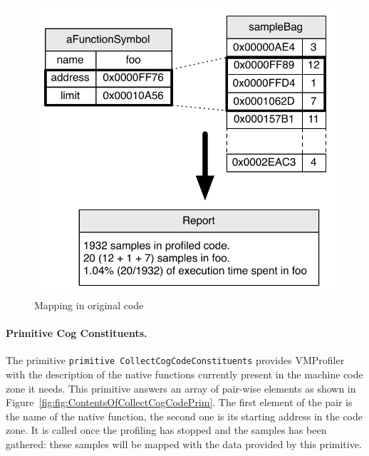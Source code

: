 \documentclass[10pt,preprint,nonatbib]{sigplanconf}
\newcommand{\ct}{\lstinline[backgroundcolor=\color{white},basicstyle=\small\ttfamily]}
\newcommand{\figlabel}[1]{\label{fig:#1}}
\newcommand{\figref}[1]{Figure~\ref{fig:#1}}
\begin{document}
 \begin{figure}[t!]
     \begin{center}
         \includegraphics[width=0.85\linewidth]{OriginalMapping}
         \caption{Mapping in original code}
         \figlabel{fig:OriginalMapping}
     \end{center}
 \end{figure}
 
 \paragraph{Primitive Cog Constituents.}
The primitive \ct{primitive CollectCogCodeConstituents} provides VMProfiler with the description of the native functions currently present in the machine code zone it needs. 
This primitive answers an array of pair-wise elements as shown in \figref{fig:ContentsOfCollectCogCodePrim}. The first element of the pair is the name of the native function, the second one is its starting address in the code zone.
It is called once the profiling has stopped and the samples has been gathered: these samples will be mapped with the data provided by this primitive.
\end{document}
